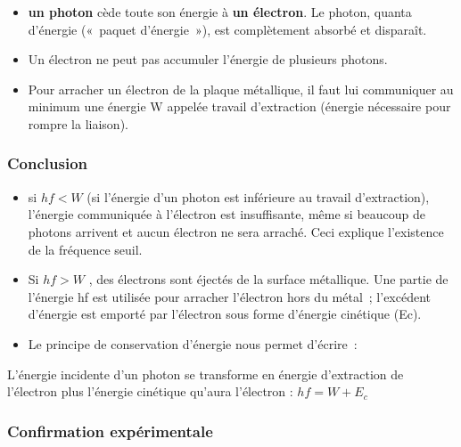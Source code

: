 \begin{itemize}

\item  \textbf{un photon} cède toute son énergie à \textbf{un électron}. Le
  photon, quanta d'énergie («~paquet d'énergie~»), est complètement
  absorbé et disparaît.
\item  Un électron ne peut pas accumuler l'énergie de plusieurs photons.
\item  Pour arracher un électron de la plaque métallique, il faut lui
  communiquer au minimum une énergie W appelée travail d'extraction
  (énergie nécessaire pour rompre la liaison).
\end{itemize}

\subsubsection*{Conclusion}

\begin{itemize}

\item  si $h f < W$ (si l'énergie d'un photon est inférieure au travail
  d'extraction), l'énergie communiquée à l'électron est insuffisante,
  même si beaucoup de photons arrivent et aucun électron ne sera
  arraché. Ceci explique l'existence de la fréquence seuil.
\item  Si $h f > W$ , des électrons sont éjectés de la surface métallique. Une
  partie de l'énergie hf est utilisée pour arracher l'électron hors du
  métal~; l'excédent d'énergie est emporté par l'électron sous forme
  d'énergie cinétique (Ec).
\item Le principe de conservation d'énergie nous permet d'écrire~:
\end{itemize}

L'énergie incidente d'un photon se transforme en énergie d'extraction de
l'électron plus l'énergie cinétique qu'aura l'électron : $h f = W + E_c$

\subsubsection{Confirmation expérimentale }

